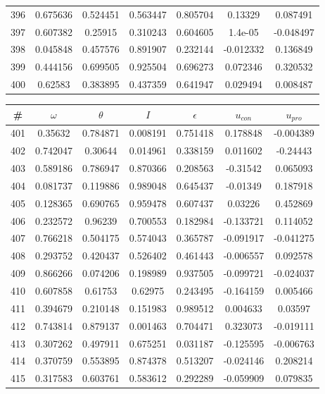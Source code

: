 \begin{table}
\begin{tabular}{c|c|c|c|c|c|c}
396 & 0.675636 & 0.524451 & 0.563447 & 0.805704 & 0.13329 & 0.087491\\
397 & 0.607382 & 0.25915 & 0.310243 & 0.604605 & 1.4e-05 & -0.048497\\
398 & 0.045848 & 0.457576 & 0.891907 & 0.232144 & -0.012332 & 0.136849\\
399 & 0.444156 & 0.699505 & 0.925504 & 0.696273 & 0.072346 & 0.320532\\
400 & 0.62583 & 0.383895 & 0.437359 & 0.641947 & 0.029494 & 0.008487\\
\end{tabular}
\end{table}
\newpage
\begin{table}
\begin{tabular}{c|c|c|c|c|c|c}
\# & $\omega$ & $\theta$ & $I$ & $\epsilon$ & $u_{con}$ & $u_{pro}$\\
\hline
401 & 0.35632 & 0.784871 & 0.008191 & 0.751418 & 0.178848 & -0.004389\\
402 & 0.742047 & 0.30644 & 0.014961 & 0.338159 & 0.011602 & -0.24443\\
403 & 0.589186 & 0.786947 & 0.870366 & 0.208563 & -0.31542 & 0.065093\\
404 & 0.081737 & 0.119886 & 0.989048 & 0.645437 & -0.01349 & 0.187918\\
405 & 0.128365 & 0.690765 & 0.959478 & 0.607437 & 0.03226 & 0.452869\\
406 & 0.232572 & 0.96239 & 0.700553 & 0.182984 & -0.133721 & 0.114052\\
407 & 0.766218 & 0.504175 & 0.574043 & 0.365787 & -0.091917 & -0.041275\\
408 & 0.293752 & 0.420437 & 0.526402 & 0.461443 & -0.006557 & 0.092578\\
409 & 0.866266 & 0.074206 & 0.198989 & 0.937505 & -0.099721 & -0.024037\\
410 & 0.607858 & 0.61753 & 0.62975 & 0.243495 & -0.164159 & 0.005466\\
411 & 0.394679 & 0.210148 & 0.151983 & 0.989512 & 0.004633 & 0.03597\\
412 & 0.743814 & 0.879137 & 0.001463 & 0.704471 & 0.323073 & -0.019111\\
413 & 0.307262 & 0.497911 & 0.675251 & 0.031187 & -0.125595 & -0.006763\\
414 & 0.370759 & 0.553895 & 0.874378 & 0.513207 & -0.024146 & 0.208214\\
415 & 0.317583 & 0.603761 & 0.583612 & 0.292289 & -0.059909 & 0.079835\\

\end{tabular}
\end{table}
